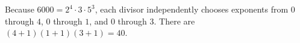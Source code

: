 Because $6000=2^4\cdot3\cdot5^3$, each divisor independently chooses exponents from $0$ through $4$, $0$ through $1$, and $0$ through $3$. There are $(4+1)(1+1)(3+1)=\boxed{40}$.
